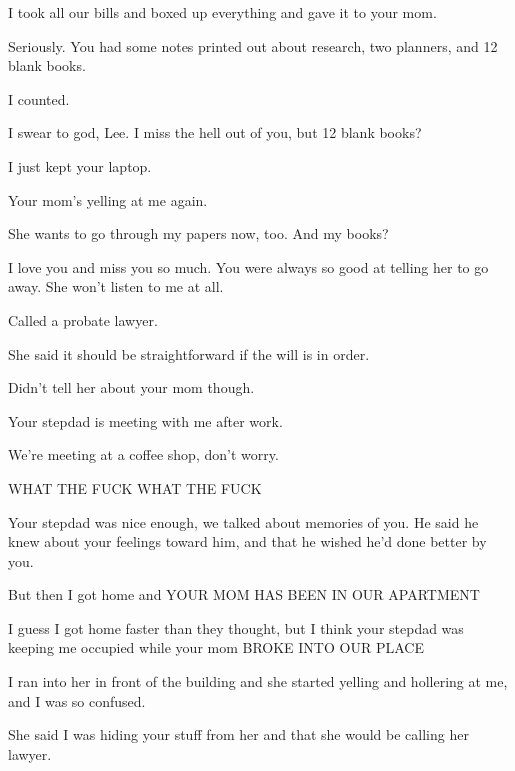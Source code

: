{ I took all our bills and boxed up everything and gave it to your mom.

 Seriously. You had some notes printed out about research, two planners, and 12 blank books.

 I counted.

 I swear to god, Lee. I miss the hell out of you, but 12 blank books?

 I just kept your laptop.

\nopagebreak

 Your mom's yelling at me again.

 She wants to go through my papers now, too. And my books?

 I love you and miss you so much. You were always so good at telling her to go away. She won't listen to me at all.

 Called a probate lawyer.

 She said it should be straightforward if the will is in order.

 Didn't tell her about your mom though.


 Your stepdad is meeting with me after work.

 We're meeting at a coffee shop, don't worry.

 WHAT THE FUCK WHAT THE FUCK

 Your stepdad was nice enough, we talked about memories of you. He said he knew about your feelings toward him, and that he wished he'd done better by you.

 But then I got home and YOUR MOM HAS BEEN IN OUR APARTMENT

 I guess I got home faster than they thought, but I think your stepdad was keeping me occupied while your mom BROKE INTO OUR PLACE

 I ran into her in front of the building and she started yelling and hollering at me, and I was so confused.

 She said I was hiding your stuff from her and that she would be calling her lawyer.

}
